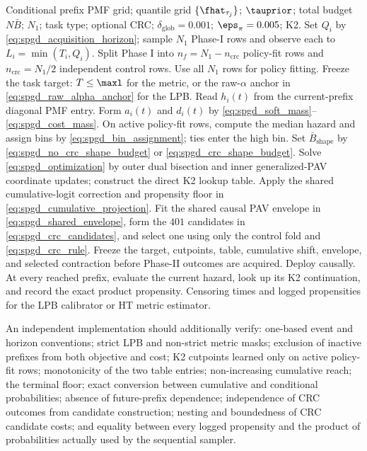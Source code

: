 \begin{algorithm}[htbp]
\caption{Soft-prefix Generalized DAPRO with hazard-K2}
\label{alg:spgd_exact}
\begin{algorithmic}[1]
\REQUIRE Conditional prefix PMF grid; quantile grid $\{\fhat_{\tau_j}\}$;
$\tauprior$; total budget $N\bar B$; $N_1$; task type; optional CRC;
$\delta_{\mathrm{glob}}=0.001$; $\eps_\pi=0.005$; K2.
\STATE Set $Q_i$ by \eqref{eq:spgd_acquisition_horizon}; sample $N_1$ Phase-I
rows and observe each to $L_i=\min(T_i,Q_i)$.
  \STATE Split Phase I into $n_f=N_1-n_{\mathrm{crc}}$ policy-fit rows and
  $n_{\mathrm{crc}}=N_1/2$ independent control rows.
\ELSE
  \STATE Use all $N_1$ rows for policy fitting.
\ENDIF
\STATE Freeze the task target: $T\leq\maxl$ for the metric, or the raw-$\alpha$
anchor in \eqref{eq:spgd_raw_alpha_anchor} for the LPB.
  \STATE Read $h_i(t)$ from the current-prefix diagonal PMF entry.
  \STATE Form $a_i(t)$ and $d_i(t)$ by
  \eqref{eq:spgd_soft_mass}--\eqref{eq:spgd_cost_mass}.
\ENDFOR
{}
  \STATE On active policy-fit rows, compute the median hazard and assign bins
  by \eqref{eq:spgd_bin_assignment}; ties enter the high bin.
\ENDFOR
\STATE Set $\bar B_{\mathrm{shape}}$ by
\eqref{eq:spgd_no_crc_shape_budget} or \eqref{eq:spgd_crc_shape_budget}.
\STATE Solve \eqref{eq:spgd_optimization} by outer dual bisection and inner
generalized-PAV coordinate updates; construct the direct K2 lookup table.
\STATE Apply the shared cumulative-logit correction and propensity floor in
\eqref{eq:spgd_cumulative_projection}.
  \STATE Fit the shared causal PAV envelope in
  \eqref{eq:spgd_shared_envelope}, form the $401$ candidates in
  \eqref{eq:spgd_crc_candidates}, and select one using only the control fold
  and \eqref{eq:spgd_crc_rule}.
\ENDIF
\STATE Freeze the target, cutpoints, table, cumulative shift, envelope, and
selected contraction before Phase-II outcomes are acquired.
\STATE Deploy causally.  At every reached prefix, evaluate the current hazard,
look up its K2 continuation, and record the exact product propensity.
\RETURN Censoring times and logged propensities for the LPB calibrator or HT
metric estimator.
\end{algorithmic}
\end{algorithm}

An independent implementation should additionally verify: one-based event
and horizon conventions; strict LPB and non-strict metric masks; exclusion of
inactive prefixes from both objective and cost; K2 cutpoints learned only on
active policy-fit rows; monotonicity of the two table entries; non-increasing
cumulative reach; the terminal floor; exact conversion between cumulative and
conditional probabilities; absence of future-prefix dependence; independence
of CRC outcomes from candidate construction; nesting and boundedness of CRC
candidate costs; and equality between every logged propensity and the product
of probabilities actually used by the sequential sampler.
